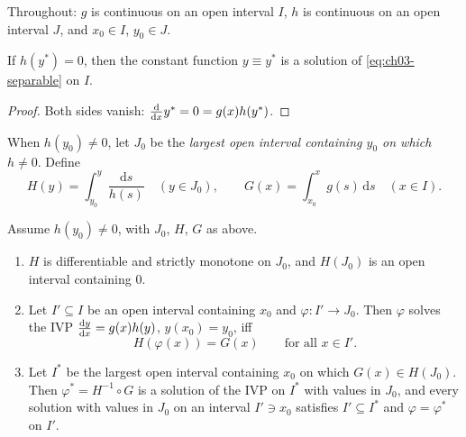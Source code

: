 Throughout: $g$ is continuous on an open interval $I$, $h$ is continuous on an
open interval $J$, and $x_0\in I$, $y_0\in J$.

\begin{proposition}[Equilibria]\label{prop:ch03-equilibria}
If $h(y^*) = 0$, then the constant function $y\equiv y^*$ is a solution of
\eqref{eq:ch03-separable} on $I$.
\end{proposition}
\begin{proof}
Both sides vanish: $\frac{\mathrm{d}}{\mathrm{d}x}y^* = 0 = g(x)h(y^*)$.
\end{proof}

When $h(y_0)\neq 0$, let $J_0$ be the \emph{largest open interval containing
$y_0$ on which $h\neq 0$}. Define
\begin{equation}\label{eq:ch03-HG}
  H(y) = \int_{y_0}^{y}\frac{\mathrm{d}s}{h(s)}\quad (y\in J_0),\qquad
  G(x) = \int_{x_0}^{x}g(s)\,\mathrm{d}s\quad (x\in I).
\end{equation}

\begin{theorem}\label{thm:ch03-separation}
Assume $h(y_0)\neq 0$, with $J_0$, $H$, $G$ as above.
\begin{enumerate}[label=(\alph*)]
  \item $H$ is differentiable and strictly monotone on $J_0$, and $H(J_0)$ is
        an open interval containing $0$.
  \item Let $I'\subseteq I$ be an open interval containing $x_0$ and
        $\varphi: I'\to J_0$. Then $\varphi$ solves the IVP
        $\frac{\mathrm{d}y}{\mathrm{d}x} = g(x)h(y)$, $y(x_0) = y_0$, iff
        \begin{equation}\label{eq:ch03-implicit}
          H(\varphi(x)) = G(x)\qquad\text{for all } x\in I'.
        \end{equation}
  \item Let $I^*$ be the largest open interval containing $x_0$ on which
        $G(x)\in H(J_0)$. Then $\varphi^* = H^{-1}\circ G$ is a solution of the
        IVP on $I^*$ with values in $J_0$, and every solution with values in
        $J_0$ on an interval $I'\ni x_0$ satisfies $I'\subseteq I^*$ and
        $\varphi = \varphi^*$ on $I'$.
\end{enumerate}
\end{theorem}

